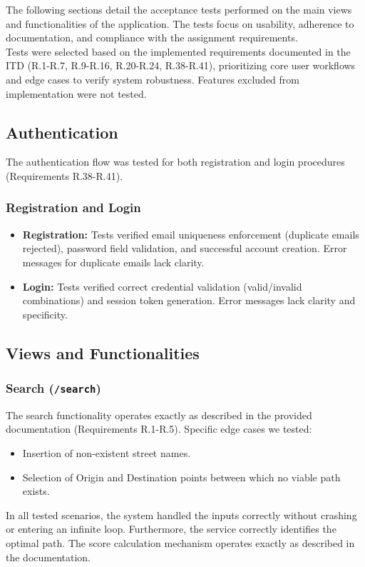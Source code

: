 The following sections detail the acceptance tests performed on the main views and functionalities of the application. The tests focus on usability, adherence to documentation, and compliance with the assignment requirements. \\ 
Tests were selected based on the implemented requirements documented in the ITD (R.1-R.7, R.9-R.16, R.20-R.24, R.38-R.41), prioritizing core user workflows and edge cases to verify system robustness. Features excluded from implementation were not tested.

\subsection{Authentication}
The authentication flow was tested for both registration and login procedures (Requirements R.38-R.41).

\subsubsection{Registration and Login}
\begin{itemize}
    \item \textbf{Registration:} Tests verified email uniqueness enforcement (duplicate emails rejected), password field validation, and successful account creation. Error messages for duplicate emails lack clarity.
    \item \textbf{Login:} Tests verified correct credential validation (valid/invalid combinations) and session token generation. Error messages lack clarity and specificity.
\end{itemize}

\subsection{Views and Functionalities}

\subsubsection{Search (\texttt{/search})}
The search functionality operates exactly as described in the provided documentation (Requirements R.1-R.5). Specific edge cases we tested:
\begin{itemize}
    \item Insertion of non-existent street names.
    \item Selection of Origin and Destination points between which no viable path exists.
\end{itemize}
In all tested scenarios, the system handled the inputs correctly without crashing or entering an infinite loop. Furthermore, the service correctly identifies the optimal path. The score calculation mechanism operates exactly as described in the documentation.

